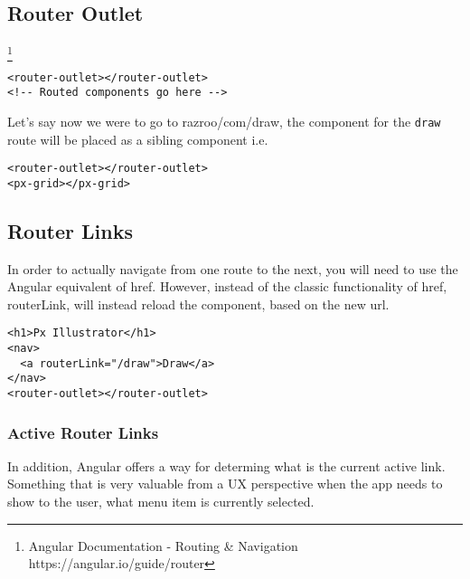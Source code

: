 
\subsection{ Router Outlet }
\begin{displayquote}
\footnote{Angular Documentation - Routing \& Navigation https://angular.io/guide/router}
\end{displayquote}

\begin{verbatim}
<router-outlet></router-outlet>
<!-- Routed components go here -->
\end{verbatim}

Let's say now we were to go to razroo/com/draw, the component for the 
\lstinline{draw} route will be placed as a sibling component i.e. 
\begin{lstlisting}
<router-outlet></router-outlet>
<px-grid></px-grid>  
\end{lstlisting}

\subsection{ Router Links }
In order to actually navigate from one route to the next, you will 
need to use the Angular equivalent of href. However, instead of 
the classic functionality of href, routerLink, will instead 
reload the component, based on the new url. 
\begin{lstlisting}
<h1>Px Illustrator</h1>
<nav>
  <a routerLink="/draw">Draw</a>
</nav>
<router-outlet></router-outlet>
\end{lstlisting}

\subsubsection{Active Router Links}
In addition, Angular offers a way for determing what is the current 
active link. Something that is very valuable from a UX perspective 
when the app needs to show to the user, what menu item is 
currently selected. 


